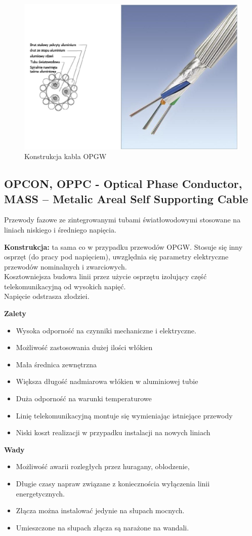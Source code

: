 \documentclass{article}
\begin{document}
\begin{figure}[H]
    \centering
    \includegraphics[width=0.6\linewidth]{w05z07.jpg}
    \caption{Konstrukcja kabla OPGW}
\end{figure}
\newpage
\subsection{OPCON, OPPC - Optical Phase Conductor, MASS – Metalic Areal Self Supporting Cable}
Przewody fazowe ze zintegrowanymi tubami światłowodowymi stosowane na liniach niskiego i średniego
napięcia.

\textbf{Konstrukcja:} ta sama co w przypadku przewodów OPGW.
Stosuje się inny osprzęt (do pracy pod napięciem), uwzględnia się parametry elektryczne przewodów nominalnych i zwarciowych.\\
Kosztowniejsza budowa linii przez użycie osprzętu izolujący część telekomunikacyjną od wysokich napięć.\\
Napięcie odstrasza złodziei.

\textbf{Zalety}
\begin{itemize}
    \item Wysoka odporność na czynniki mechaniczne i elektryczne.
    \item Możliwość zastosowania dużej ilości włókien
    \item Mała średnica zewnętrzna
    \item Większa długość nadmiarowa włókien w aluminiowej tubie
    \item Duża odporność na warunki temperaturowe
    \item Linię telekomunikacyjną montuje się wymieniając istniejące przewody
    \item Niski koszt realizacji w przypadku instalacji na nowych liniach
\end{itemize}

\textbf{Wady}
\begin{itemize}
    \item Możliwość awarii rozległych przez huragany, oblodzenie,
    \item Długie czasy napraw związane z koniecznościa wyłączenia linii energetycznych.
    \item Złącza można instalować jedynie na słupach mocnych.
    \item Umieszczone na słupach złącza są narażone na wandali.
\end{itemize}
\end{document}
